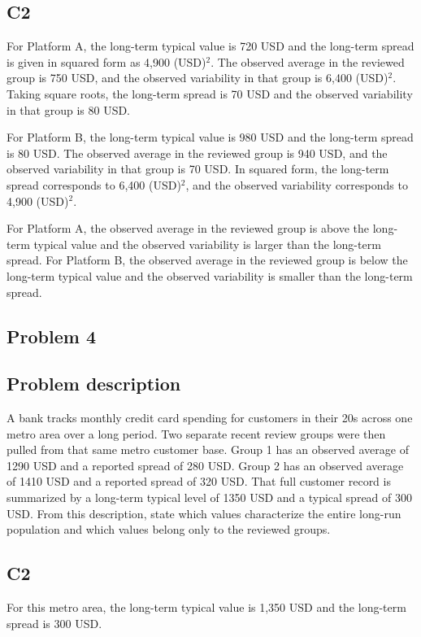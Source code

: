 \begin{ExamProblems}
\subsection*{C2}
		For Platform A, the long-term typical value is 720 USD and the long-term spread is given in squared form as 4,900 (USD)$^2$.
		The observed average in the reviewed group is 750 USD, and the observed variability in that group is 6,400 (USD)$^2$.
		Taking square roots, the long-term spread is 70 USD and the observed variability in that group is 80 USD.

		For Platform B, the long-term typical value is 980 USD and the long-term spread is 80 USD.
		The observed average in the reviewed group is 940 USD, and the observed variability in that group is 70 USD.
		In squared form, the long-term spread corresponds to 6,400 (USD)$^2$, and the observed variability corresponds to 4,900 (USD)$^2$.

		For Platform A, the observed average in the reviewed group is above the long-term typical value and the observed variability is larger than the long-term spread.
		For Platform B, the observed average in the reviewed group is below the long-term typical value and the observed variability is smaller than the long-term spread.


		\newpage
		\item
		\subsection*{Problem 4}
		\subsection*{Problem description}
		A bank tracks monthly credit card spending for customers in their 20s across one metro area over a long period.
		Two separate recent review groups were then pulled from that same metro customer base.
		Group 1 has an observed average of 1290 USD and a reported spread of 280 USD.
		Group 2 has an observed average of 1410 USD and a reported spread of 320 USD.
		That full customer record is summarized by a long-term typical level of 1350 USD and a typical spread of 300 USD.
		From this description, state which values characterize the entire long-run population and which values belong only to the reviewed groups.

\subsection*{C2}
		For this metro area, the long-term typical value is 1,350 USD and the long-term spread is 300 USD.


\end{ExamProblems}
